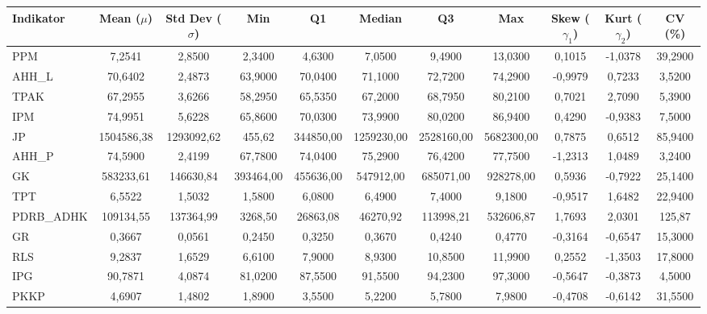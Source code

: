 \begin{adjustbox}{max width=\textwidth}
\small
\begin{tabular}{|>{\centering\arraybackslash}p{2.5cm}|c|c|c|c|c|c|c|c|c|c|}
\hline
\textbf{Indikator} & \textbf{Mean ($\mu$)} & \textbf{Std Dev ($\sigma$)} & \textbf{Min} & \textbf{Q1} & \textbf{Median} & \textbf{Q3} & \textbf{Max} & \textbf{Skew ($\gamma_1$)} & \textbf{Kurt ($\gamma_2$)} & \textbf{CV (\%)} \\
\hline
PPM & 7,2541 & 2,8500 & 2,3400 & 4,6300 & 7,0500 & 9,4900 & 13,0300 & 0,1015 & -1,0378 & 39,2900 \\
AHH\_L & 70,6402 & 2,4873 & 63,9000 & 70,0400 & 71,1000 & 72,7200 & 74,2900 & -0,9979 & 0,7233 & 3,5200 \\
TPAK & 67,2955 & 3,6266 & 58,2950 & 65,5350 & 67,2000 & 68,7950 & 80,2100 & 0,7021 & 2,7090 & 5,3900 \\
IPM & 74,9951 & 5,6228 & 65,8600 & 70,0300 & 73,9900 & 80,0200 & 86,9400 & 0,4290 & -0,9383 & 7,5000 \\
JP & 1504586,38 & 1293092,62 & 455,62 & 344850,00 & 1259230,00 & 2528160,00 & 5682300,00 & 0,7875 & 0,6512 & 85,9400 \\
AHH\_P & 74,5900 & 2,4199 & 67,7800 & 74,0400 & 75,2900 & 76,4200 & 77,7500 & -1,2313 & 1,0489 & 3,2400 \\
GK & 583233,61 & 146630,84 & 393464,00 & 455636,00 & 547912,00 & 685071,00 & 928278,00 & 0,5936 & -0,7922 & 25,1400 \\
TPT & 6,5522 & 1,5032 & 1,5800 & 6,0800 & 6,4900 & 7,4000 & 9,1800 & -0,9517 & 1,6482 & 22,9400 \\
PDRB\_ADHK & 109134,55 & 137364,99 & 3268,50 & 26863,08 & 46270,92 & 113998,21 & 532606,87 & 1,7693 & 2,0301 & 125,87 \\
GR & 0,3667 & 0,0561 & 0,2450 & 0,3250 & 0,3670 & 0,4240 & 0,4770 & -0,3164 & -0,6547 & 15,3000 \\
RLS & 9,2837 & 1,6529 & 6,6100 & 7,9000 & 8,9300 & 10,8500 & 11,9900 & 0,2552 & -1,3503 & 17,8000 \\
IPG & 90,7871 & 4,0874 & 81,0200 & 87,5500 & 91,5500 & 94,2300 & 97,3000 & -0,5647 & -0,3873 & 4,5000 \\
PKKP & 4,6907 & 1,4802 & 1,8900 & 3,5500 & 5,2200 & 5,7800 & 7,9800 & -0,4708 & -0,6142 & 31,5500 \\
\hline
\end{tabular}
\end{adjustbox}
